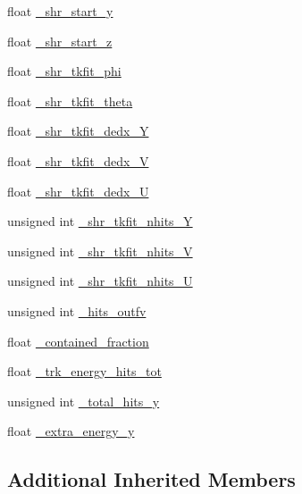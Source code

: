 \begin{DoxyCompactItemize}
float \hyperlink{classselection_1_1CC0piNpSelection_ade6717f479b053a2c2c9082e597d599f}{\-\_\-shr\-\_\-start\-\_\-y}
\item 
float \hyperlink{classselection_1_1CC0piNpSelection_a6e8b4637c8de2991e4d48291d3e90ddf}{\-\_\-shr\-\_\-start\-\_\-z}
\item 
float \hyperlink{classselection_1_1CC0piNpSelection_aefb0bc61c417330a448ababb5363ad8f}{\-\_\-shr\-\_\-tkfit\-\_\-phi}
\item 
float \hyperlink{classselection_1_1CC0piNpSelection_a11df391e482434665c389423bbb9ec5d}{\-\_\-shr\-\_\-tkfit\-\_\-theta}
\item 
float \hyperlink{classselection_1_1CC0piNpSelection_ababbbc32babdef645c2edc613713ceb7}{\-\_\-shr\-\_\-tkfit\-\_\-dedx\-\_\-\-Y}
\item 
float \hyperlink{classselection_1_1CC0piNpSelection_a428fc549513bea0e1ca92cf90c1148cd}{\-\_\-shr\-\_\-tkfit\-\_\-dedx\-\_\-\-V}
\item 
float \hyperlink{classselection_1_1CC0piNpSelection_aaaef69409457695e2300bf847a13804c}{\-\_\-shr\-\_\-tkfit\-\_\-dedx\-\_\-\-U}
\item 
unsigned int \hyperlink{classselection_1_1CC0piNpSelection_ae3a53326b19594013c9df08b66ccaa73}{\-\_\-shr\-\_\-tkfit\-\_\-nhits\-\_\-\-Y}
\item 
unsigned int \hyperlink{classselection_1_1CC0piNpSelection_adab23c54dd799cdf83c31a10e4ae9061}{\-\_\-shr\-\_\-tkfit\-\_\-nhits\-\_\-\-V}
\item 
unsigned int \hyperlink{classselection_1_1CC0piNpSelection_a6c75f5783174133ce97849f128f3dee3}{\-\_\-shr\-\_\-tkfit\-\_\-nhits\-\_\-\-U}
\item 
unsigned int \hyperlink{classselection_1_1CC0piNpSelection_ac39ec79d190fb925f8d20b03cbeb0605}{\-\_\-hits\-\_\-outfv}
\item 
float \hyperlink{classselection_1_1CC0piNpSelection_a8e7933222bce1424aee24bae8dcf4864}{\-\_\-contained\-\_\-fraction}
\item 
float \hyperlink{classselection_1_1CC0piNpSelection_a82a48c6128c34252642d237b98f1b66a}{\-\_\-trk\-\_\-energy\-\_\-hits\-\_\-tot}
\item 
unsigned int \hyperlink{classselection_1_1CC0piNpSelection_a819d1d973e74bcd2ad82aa01ea24ac37}{\-\_\-total\-\_\-hits\-\_\-y}
\item 
float \hyperlink{classselection_1_1CC0piNpSelection_a2e386c361ecc27d22ff2642e80a629e4}{\-\_\-extra\-\_\-energy\-\_\-y}
\end{DoxyCompactItemize}
\subsection*{Additional Inherited Members}


